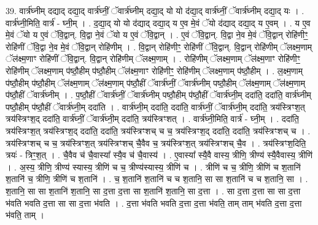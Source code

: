\documentclass[17pt]{extarticle}
\begin{document}
39. वार्त्र॑घ्नीम् दद्याद् दद्या॒द् वार्त्र॑घ्नीं॒ ॅवार्त्र॑घ्नीम् दद्या॒द् यो यो द॑द्या॒द् वार्त्र॑घ्नीं॒ ॅवार्त्र॑घ्नीम् दद्या॒द् यः । . वार्त्र॑घ्नी॒मिति॒ वार्त्र॑ - घ्नी॒म् । . द॒द्या॒द् यो यो द॑द्याद् दद्या॒द् य ए॒व मे॒वं ॅयो द॑द्याद् दद्या॒द् य ए॒वम् । . य ए॒व मे॒वं ॅयो य ए॒वं ॅवि॒द्वान्. वि॒द्वा ने॒वं ॅयो य ए॒वं ॅवि॒द्वान् । . ए॒वं ॅवि॒द्वान्. वि॒द्वा ने॒व मे॒वं ॅवि॒द्वान् रोहि॑णीꣳ॒॒ रोहि॑णीं ॅवि॒द्वा ने॒व मे॒वं ॅवि॒द्वान् रोहि॑णीम् । . वि॒द्वान् रोहि॑णीꣳ॒॒ रोहि॑णीं ॅवि॒द्वान्. वि॒द्वान् रोहि॑णीम् ॅलक्ष्म॒णाम् ॅल॑क्ष्म॒णाꣳ रोहि॑णीं ॅवि॒द्वान्. वि॒द्वान् रोहि॑णीम् ॅलक्ष्म॒णाम् । . रोहि॑णीम् ॅलक्ष्म॒णाम् ॅल॑क्ष्म॒णाꣳ रोहि॑णीꣳ॒॒ रोहि॑णीम् ॅलक्ष्म॒णाम् प॑ष्ठौ॒हीम् प॑ष्ठौ॒हीम् ॅल॑क्ष्म॒णाꣳ रोहि॑णीꣳ॒॒ रोहि॑णीम् ॅलक्ष्म॒णाम् प॑ष्ठौ॒हीम् । . ल॒क्ष्म॒णाम् प॑ष्ठौ॒हीम् प॑ष्ठौ॒हीम् ॅल॑क्ष्म॒णाम् ॅल॑क्ष्म॒णाम् प॑ष्ठौ॒हीं ॅवार्त्र॑घ्नीं॒ ॅवार्त्र॑घ्नीम् पष्ठौ॒हीम् ॅल॑क्ष्म॒णाम् ॅल॑क्ष्म॒णाम् प॑ष्ठौ॒हीं ॅवार्त्र॑घ्नीम् । . प॒ष्ठौ॒हीं ॅवार्त्र॑घ्नीं॒ ॅवार्त्र॑घ्नीम् पष्ठौ॒हीम् प॑ष्ठौ॒हीं ॅवार्त्र॑घ्नी॒म् ददा॑ति॒ ददा॑ति॒ वार्त्र॑घ्नीम् पष्ठौ॒हीम् प॑ष्ठौ॒हीं ॅवार्त्र॑घ्नी॒म् ददा॑ति । . वार्त्र॑घ्नी॒म् ददा॑ति॒ ददा॑ति॒ वार्त्र॑घ्नीं॒ ॅवार्त्र॑घ्नी॒म् ददा॑ति॒ त्रय॑स्त्रिꣳश॒त् त्रय॑स्त्रिꣳश॒द् ददा॑ति॒ वार्त्र॑घ्नीं॒ ॅवार्त्र॑घ्नी॒म् ददा॑ति॒ त्रय॑स्त्रिꣳशत् । . वार्त्र॑घ्नी॒मिति॒ वार्त्र॑ - घ्नी॒म् । . ददा॑ति॒ त्रय॑स्त्रिꣳश॒त् त्रय॑स्त्रिꣳश॒द् ददा॑ति॒ ददा॑ति॒ त्रय॑स्त्रिꣳशच् च च॒ त्रय॑स्त्रिꣳश॒द् ददा॑ति॒ ददा॑ति॒ त्रय॑स्त्रिꣳशच् च । . त्रय॑स्त्रिꣳशच् च च॒ त्रय॑स्त्रिꣳश॒त् त्रय॑स्त्रिꣳशच् चै॒वैव च॒ त्रय॑स्त्रिꣳश॒त् त्रय॑स्त्रिꣳशच् चै॒व । . त्रय॑स्त्रिꣳश॒दिति॒ त्रयः॑ - त्रिꣳ॒॒श॒त् । . चै॒वैव च॑ चै॒वास्या᳚ स्यै॒व च॑ चै॒वास्य॑ । . ए॒वास्या᳚ स्यै॒वै वास्य॒ त्रीणि॒ त्रीण्य॑ स्यै॒वैवास्य॒ त्रीणि॑ । . अ॒स्य॒ त्रीणि॒ त्रीण्य॑ स्यास्य॒ त्रीणि॑ च च॒ त्रीण्य॑स्यास्य॒ त्रीणि॑ च । . त्रीणि॑ च च॒ त्रीणि॒ त्रीणि॑ च श॒तानि॑ श॒तानि॑ च॒ त्रीणि॒ त्रीणि॑ च श॒तानि॑ । . च॒ श॒तानि॑ श॒तानि॑ च च श॒तानि॒ सा सा श॒तानि॑ च च श॒तानि॒ सा । . श॒तानि॒ सा सा श॒तानि॑ श॒तानि॒ सा द॒त्ता द॒त्ता सा श॒तानि॑ श॒तानि॒ सा द॒त्ता । . सा द॒त्ता द॒त्ता सा सा द॒त्ता भ॑वति भवति द॒त्ता सा सा द॒त्ता भ॑वति । . द॒त्ता भ॑वति भवति द॒त्ता द॒त्ता भ॑वति॒ ताम् ताम् भ॑वति द॒त्ता द॒त्ता भ॑वति॒ ताम् । \newline
\pagebreak
{}
\end{document}
